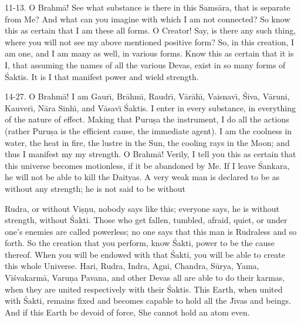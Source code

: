 11-13. O Brahm\=a! See what substance is there in this Sams\=ara, that is separate from Me? And what can you imagine with which I am not connected? So know this as certain that I am these all forms. O Creator! Say, is there any such thing, where you will not see my above mentioned positive form? So, in this creation, I am one, and I am many as well, in various forms. Know this as certain that it is I, that assuming the names of all the various Devas, exist in so many forms of \'Saktis. It is I that manifest power and wield strength.

14-27. O Brahm\=a! I am Gaur\={\i}, Br\=ahm\={\i}, Raudr\={\i}, V\=ar\=ah\={\i}, Vaisnav\={\i}, \'Siva, V\=aruni, Kauver\={\i}, N\=ara Sinh\={\i}, and V\=asav\={\i} \'Saktis. I enter in every substance, in everything of the nature of effect. Making that Puru\d{s}a the instrument, I do all the actions (rather Puru\d{s}a is the efficient cause, the immediate agent). I am the coolness in water, the heat in fire, the lustre in the Sun, the cooling rays in the Moon; and thus I manifest my my strength. O Brahm\=a! Verily, I tell you this as certain that this universe becomes motionless, if it be abandoned by Me. If I leave \'Sankara, he will not be able to kill the Daityas. A very weak man is declared to be as without any strength; he is not said to be without

Rudra, or without Vi\d{s}\d{n}u, nobody says like this; everyone says, he is without strength, without \'Sakti. Those who get fallen, tumbled, afraid, quiet, or under one's enemies are called powerless; no one says that this man is Rudraless and so forth. So the creation that you perform, know \'Sakti, power to be the cause thereof. When you will be endowed with that \'Sakti, you will be able to create this whole Universe. Hari, Rudra, Indra, Agni, Chandra, S\=urya, Yama, Vi\'svakarm\=a, Varu\d{n}a Pavana, and other Devas all are able to do their karmas, when they are united respectively with their \'Saktis. This Earth, when united with \'Sakti, remains fixed and becomes capable to hold all the J\={\i}vas and beings. And if this Earth be devoid of force, She cannot hold an atom even.


